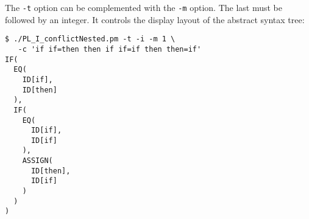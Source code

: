 The \verb|-t| option can be complemented with the \verb|-m| option.
The last must be followed by an integer.
It controls the display layout of 
the abstract syntax tree:
\begin{verbatim}
$ ./PL_I_conflictNested.pm -t -i -m 1 \
   -c 'if if=then then if if=if then then=if'
IF(
  EQ(
    ID[if],
    ID[then]
  ),
  IF(
    EQ(
      ID[if],
      ID[if]
    ),
    ASSIGN(
      ID[then],
      ID[if]
    )
  )
)
\end{verbatim}


